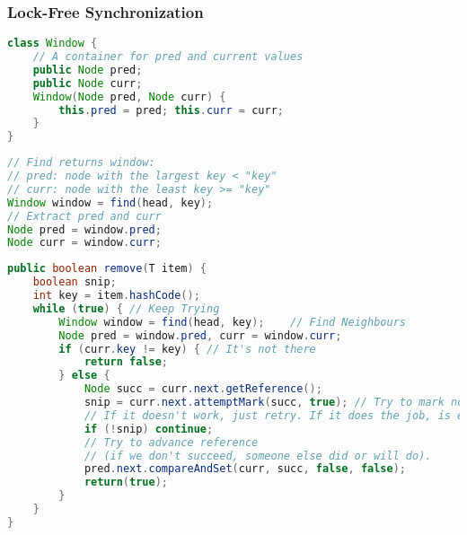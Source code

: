 \subsubsection{Lock-Free Synchronization}\label{appendix:lockfree}
\begin{tcolorbox}[colback=nightblue!5!white, colframe=nightblue!75!black, title= The Window Inner Class]
    \begin{lstlisting}[label={lst:lockfree1}, language=Java, morekeywords={Window, Node}]
class Window {
    // A container for pred and current values
    public Node pred;
    public Node curr;
    Window(Node pred, Node curr) {
        this.pred = pred; this.curr = curr;
    }
}\end{lstlisting}
\end{tcolorbox}
%
\begin{tcolorbox}[colback=nightblue!5!white, colframe=nightblue!75!black, title= The find method]
    \begin{lstlisting}[label={lst:lockfree2}, language=Java, morekeywords={Window, Node}]
// Find returns window:
// pred: node with the largest key < "key"
// curr: node with the least key >= "key"
Window window = find(head, key);
// Extract pred and curr
Node pred = window.pred;
Node curr = window.curr;\end{lstlisting}
\end{tcolorbox}
%
\begin{tcolorbox}[colback=nightblue!5!white, colframe=nightblue!75!black, title= Remove(Lock-Free)]
    \begin{lstlisting}[label={lst:lockfree3}, language=Java, morekeywords={Window, Node, T}]
public boolean remove(T item) {
    boolean snip;
    int key = item.hashCode();
    while (true) { // Keep Trying
        Window window = find(head, key);    // Find Neighbours
        Node pred = window.pred, curr = window.curr;
        if (curr.key != key) { // It's not there
            return false;
        } else {
            Node succ = curr.next.getReference();
            snip = curr.next.attemptMark(succ, true); // Try to mark node as deleted
            // If it doesn't work, just retry. If it does the job, is essentially done.
            if (!snip) continue;
            // Try to advance reference
            // (if we don't succeed, someone else did or will do).
            pred.next.compareAndSet(curr, succ, false, false);
            return(true);
        }
    }
}\end{lstlisting}
\end{tcolorbox}
